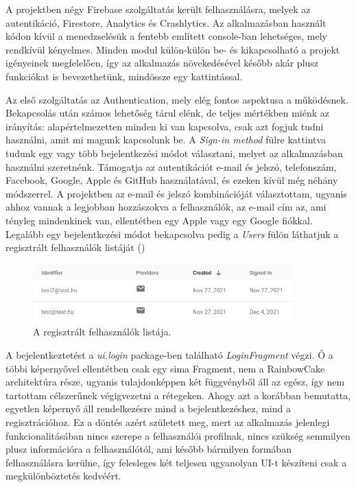 A projektben négy Firebase szolgáltatás került felhasználásra, melyek az autentikáció, Firestore, Analytics és Crashlytics. Az alkalmazásban használt kódon kívül a menedzselésük a fentebb említett console-ban lehetséges, mely rendkívül kényelmes. Minden modul külön-külön be- és kikapcsolható a projekt igényeinek megfelelően, így az alkalmazás növekedésével később akár plusz funkciókat is bevezethetünk, mindössze egy kattintással. 

Az első szolgáltatás az Authentication, mely elég fontos aspektusa a működésnek. Bekapcsolás után számos lehetőség tárul elénk, de teljes mértékben miénk az irányítás: alapértelmezetten minden ki van kapcsolva, csak azt fogjuk tudni használni, amit mi magunk kapcsolunk be. A \emph{Sign-in method} fülre kattintva tudunk egy vagy több bejelentkezési módot választani, melyet az alkalmazásban használni szeretnénk. Támogatja az autentikációt e-mail és jelszó, telefonszám, Facebook, Google, Apple és GitHub használatával, és ezeken kívül még néhány módszerrel. A projektben az e-mail és jelszó kombinációját választottam, ugyanis ahhoz vannak a legjobban hozzászokva a felhasználók, az e-mail cím az, ami tényleg mindenkinek van, ellentétben egy Apple vagy egy Google fiókkal. Legalább egy bejelentkezési módot bekapcsolva pedig a \emph{Users} fülön láthatjuk a regisztrált felhasználók listáját ()

\begin{figure}[!ht]
	\centering
	\includegraphics[width=100mm, keepaspectratio]{figures/auth_users.png}
	\caption{A regisztrált felhasználók listája.}
	\label{fig:AuthUsers}
\end{figure}

A bejelentkeztetést a \emph{ui.login} package-ben található \emph{LoginFragment} végzi. Ő a többi képernyővel ellentétben csak egy sima Fragment, nem a RainbowCake architektúra része, ugyanis tulajdonképpen két függvényből áll az egész, így nem tartottam célszerűnek végigvezetni a rétegeken. Ahogy azt a  korábban bemutatta, egyetlen képernyő áll rendelkezésre mind a bejelentkezéshez, mind a regisztrációhoz. Ez a döntés azért született meg, mert az alkalmazás jelenlegi funkcionalitásában nincs szerepe a felhasználói profilnak, nincs szükség semmilyen plusz információra a felhasználótól, ami később bármilyen formában felhasználásra kerülne, így felesleges két teljesen ugyanolyan UI-t készíteni csak a megkülönböztetés kedvéért.

